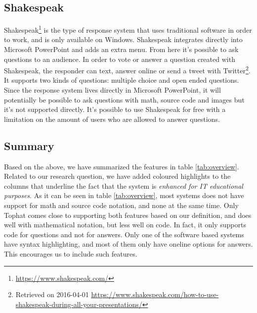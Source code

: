 \subsection*{Shakespeak}
Shakespeak\footnote{\url{https://www.shakespeak.com/}} is the type of response system that uses traditional software in order to work, and is only available on Windows. Shakespeak integrates directly into Microsoft PowerPoint and adds an extra menu. From here it's possible to ask questions to an audience. 
In order to vote or answer a question created with Shakespeak, the responder can text, answer online or send a tweet with Twitter\footnote{Retrieved on 2016-04-01 \url{https://www.shakespeak.com/how-to-use-shakespeak-during-all-your-presentations/}}. It supports two kinds of questions: multiple choice and open ended questions. Since the response system lives directly in Microsoft PowerPoint, it will potentially be possible to ask questions with math, source code and images but it's not supported directly. It's possible to use Shakespeak for free with a limitation on the amount of users who are allowed to answer questions.


\subsection{Summary}
Based on the above, we have summarized the features in table \ref{tab:overview}. Related to our research question, we have added coloured highlights to the columns that underline the fact that the system is \emph{enhanced for IT educational purposes}. As it can be seen in table \ref{tab:overview}, most systems does not have support for math and source code notation, and none at the same time. Only Tophat comes close to supporting both features based on our definition, and does well with mathematical notation, but less well on code. In fact, it only supports code for questions and not for answers. 
Only one of the software based systems have syntax highlighting, and most of them only have oneline options for answers. This encourages us to include such features.



